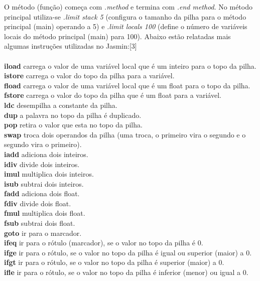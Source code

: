 \documentclass[12pt,a4paper,twoside]{report}
\begin{document}
 O método (função) começa com  \textit{ .method} e termina com   \textit{ .end
method}. No método principal utiliza-se \textit{ .limit stack 5}
 (configura o tamanho da pilha para o método
principal (main) operando a 5) e  \textit{ .limit locals 100}
 (define o número de variáveis locais do método
principal (main) para 100).
Abaixo estão relatadas mais algumas instruções utilizadas no Jasmin:[3]\\ \\
 \textbf{iload} carrega o valor de uma variável local que é um inteiro para o topo da pilha.\\
 \textbf{istore} carrega o valor do topo da pilha para a variável.\\
 \textbf{fload} carrega o valor de uma variável local que é um float para o topo da pilha.\\
 \textbf{fstore} carrega o valor do topo da pilha que é um float para a variável.\\
 \textbf{ldc} desempilha a constante da pilha.\\
 \textbf{dup} a palavra no topo da pilha é duplicado.\\
 \textbf{pop} retira o valor que esta no topo da pilha.\\
 \textbf{swap} troca dois operandos da pilha (uma troca, o primeiro vira o segundo e o segundo vira o primeiro).\\
 \textbf{iadd} adiciona dois inteiros.\\
 \textbf{idiv} divide dois inteiros.\\
 \textbf{imul}  multiplica dois inteiros.\\
 \textbf{isub} subtrai dois inteiros.\\
 \textbf{fadd} adiciona dois float.\\
 \textbf{fdiv} divide dois float.\\
 \textbf{fmul} multiplica dois float.\\
 \textbf{fsub} subtrai dois float.\\
 \textbf{goto}  ir para o marcador.\\
 \textbf{ifeq} ir para o rótulo (marcador), se o valor no topo da pilha é 0.\\
 \textbf{ifge} ir para o rótulo, se o valor no topo da pilha é igual ou superior (maior) a 0.\\
 \textbf{ifgt} ir para o rótulo, se o valor no topo da pilha é superior (maior) a 0.\\
 \textbf{ifle} ir para o rótulo, se o valor no topo da pilha é inferior (menor) ou igual a 0.\\
\end{document}
